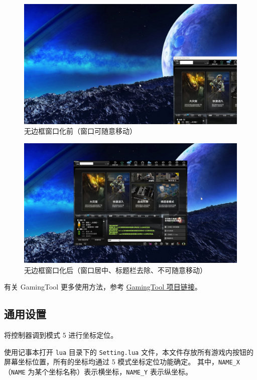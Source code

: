 \begin{figure}
    \Centering
    \includegraphics[width=\textwidth]{docs/assets/before-make-borderless.png}
    \caption{无边框窗口化前（窗口可随意移动）}
    \label{ch2fig-before-make-borderless}
\end{figure}

\begin{figure}
    \Centering
    \includegraphics[width=\textwidth]{docs/assets/after-make-borderless.png}
    \caption{无边框窗口化后（窗口居中、标题栏去除、不可随意移动）}
    \label{ch2fig-after-make-borderless}
\end{figure}

有关 GamingTool 更多使用方法，参考 \href{https://gitee.com/silver1867/gaming-tool}{GamingTool 项目链接}。

\subsection{通用设置}

将控制器调到模式 5 进行坐标定位。

使用记事本打开 \lstinline{lua} 目录下的 \lstinline{Setting.lua} 文件，本文件存放所有游戏内按钮的屏幕坐标位置，所有的坐标均通过 5 模式坐标定位功能确定。
其中，\lstinline{NAME_X}（\lstinline{NAME} 为某个坐标名称）表示横坐标，\lstinline{NAME_Y} 表示纵坐标。

